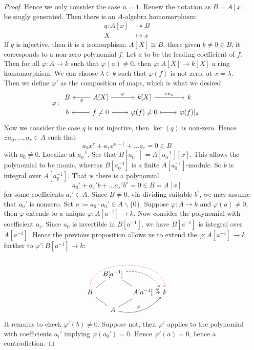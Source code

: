 \documentclass[12pt]{article}
\theoremstyle{definition}
\theoremstyle{plain}
\DeclareMathOperator{\ev}{ev}
\newcommand{\surj}{\twoheadrightarrow}
\begin{document}
\begin{proof}
\medskip
Hence we only consider the case $n=1$. Renew the notation as $B=A[x]$ be singly generated. Then there is an $A$-algebra homomorphism:
\begin{align*}
  q:A[x]&\surj B\\
  X&\mapsto x
\end{align*}
If $q$ is injective, then it is a isomorphism: $A[X]\cong B$. there given $b\neq 0\in B$, it corresponds to a non-zero polynomial $f$. Let $a$ to be the leading coefficient of $f$. Then for all $\varphi:A\to k$ such that $\varphi(a)\neq 0$, then $\varphi:A[X]\to k[X]$ a ring homomorphism. We can choose $\lambda\in k$ such that $\varphi(f)$ is not zero. at $x=\lambda$. Then we define $\varphi'$ as the composition of maps, which is what we desired:
\[\varphi:\begin{tikzcd}[row sep=tiny]
  B&A[X]\lar{q}\rar{\varphi}&k[X]\rar{\ev_\lambda}& k\\
b &f\neq 0\lar[|->]\rar[|->]&\varphi(f)\neq 0\rar[|->]&\varphi(f)|_\lambda
\end{tikzcd}\]
Now we consider the case $q$ is not injective, then $\ker(q)$ is non-zero. Hence $\exists a_0, ..., a_r\in A$ such that \[a_0x^r+a_1x^{n-1}+...a_r=0\in B\]
with $a_0\neq 0$. Localize at $a_0^{-1}$. See that $B[a_0^{-1}]=A[a_0^{-1}][x]$. This allows the polynomial to be monic, whereas $B[a_0^{-1}]$ is a finite $A[a_0^{-1}]$-module. So $b$ is integral over $A[a^{-1}_0]$. That is there is a polynomial \[a_0'+a_1'b+...a_s'b^s=0 \in B=A[x]\]
for some coefficients $a_i'\in A$. Since $B\neq 0$, via dividing suitable $b^i$, we may assume that $a_0'$ is nonzero. Set $a:=a_0\cdot a_0'\in A\backslash\{0\}$. Suppose $\varphi:A\to k$ and $\varphi(a)\neq 0$, then $\varphi$ extends to a unique $\varphi: A[a^{-1}]\to k$. Now consider the polynomial with coefficient $a_i$. Since $a_0$ is invertible in $B[a^{-1}]$, we have $B[a^{-1}]$ is integral over $A[a^{-1}]$. Hence the previous proposition allows us to extend the $\varphi:A[a^{-1}]\to k$ further to $\varphi':B[a^{-1}]\to k$:
\begin{equation}
  \begin{tikzcd}[column sep=tiny, row sep=small]
    &B[a^{-1}]\ar[dashed, bend left]{rrd}\\
    B\ar[-]{ru}\ar[dashed, red, crossing over, bend left=90]{rrr}& &A[a^{-1}]\ar[-]{lu}\ar{r}{\varphi} &k\\
    &A\ar[bend right]{rru}{\varphi}\ar[-]{lu}\ar[-]{ru}
  \end{tikzcd}
\end{equation}It remains to check $\varphi'(b)\neq 0$. Suppose not, then $\varphi'$ applies to the polynomial with coefficients $a_i'$ implying $\varphi(a_0')=0$. Hence $\varphi'(a)=0$, hence a contradiction. \qedhere
\end{proof}
\end{document}
